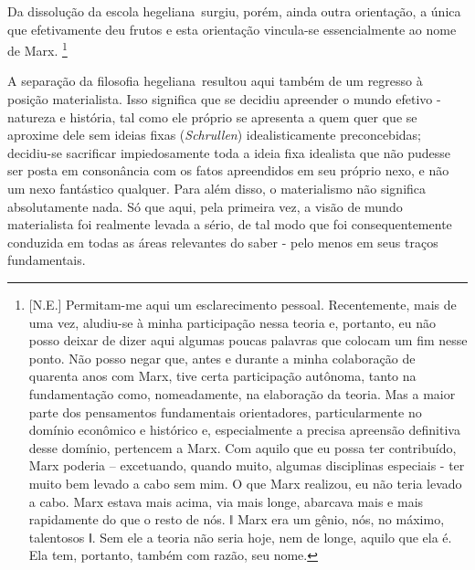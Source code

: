 Da dissolução da escola hegeliana~surgiu, porém, ainda outra orientação,
a única que efetivamente deu frutos e esta orientação vincula-se
essencialmente ao nome de Marx\protect\hypertarget{r29}{}{}. \footnote{{[}N.E.{]}
  Permitam-me aqui um esclarecimento pessoal. Recentemente, mais de uma
  vez, aludiu-se à minha participação nessa teoria e, portanto, eu não
  posso deixar de dizer aqui algumas poucas palavras que colocam um fim
  nesse ponto. Não posso negar que, antes e durante a minha colaboração
  de quarenta anos com Marx, tive certa participação autônoma, tanto na
  fundamentação como, nomeadamente, na elaboração da teoria. Mas a maior
  parte dos pensamentos fundamentais orientadores, particularmente no
  domínio econômico e histórico e, especialmente a precisa apreensão
  definitiva desse domínio, pertencem a Marx. Com aquilo que eu possa
  ter contribuído, Marx poderia -- excetuando, quando muito, algumas
  disciplinas especiais - ter muito bem levado a cabo sem mim. O que
  Marx realizou, eu não teria levado a cabo. Marx estava mais acima, via
  mais longe, abarcava mais e mais rapidamente do que o resto de nós. ǁ
  Marx era um gênio, nós, no máximo, talentosos ǁ. Sem ele a teoria não
  seria hoje, nem de longe, aquilo que ela é. Ela tem, portanto, também
  com razão, seu nome.}

A separação da filosofia hegeliana~resultou aqui também de um regresso à
posição materialista. Isso significa que se decidiu apreender o mundo
efetivo - natureza e história, tal como ele próprio se apresenta a quem
quer que se aproxime dele sem ideias fixas (\emph{Schrullen})
idealisticamente preconcebidas; decidiu-se sacrificar impiedosamente
toda a ideia fixa idealista que não pudesse ser posta em consonância com
os fatos apreendidos em seu próprio nexo, e não um nexo fantástico
qualquer. Para além disso, o materialismo não significa absolutamente
nada. Só que aqui, pela primeira vez, a visão de mundo materialista foi
realmente levada a sério, de tal modo que foi consequentemente conduzida
em todas as áreas relevantes do saber - pelo menos em seus traços
fundamentais.


